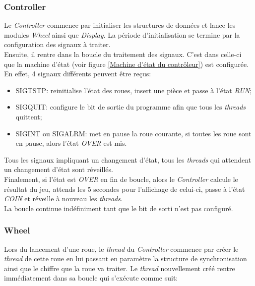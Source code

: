 \documentclass[11pt, a4paper]{article}
\begin{document}
\subsubsection{Controller}
Le \textit{Controller} commence par initialiser les structures de données
et lance les modules \textit{Wheel} ainsi que \textit{Display}.
La période d'initialisation se termine par la configuration des signaux à traiter. \\

Ensuite, il rentre dans la boucle du traitement des signaux.
C'est dans celle-ci que la machine d'état (voir figure \ref{Machine d'état du contrôleur}) est configurée.
En effet, 4 signaux différents peuvent être reçus:
\begin{itemize}
    \item SIGTSTP: reinitialise l'état des roues, insert une pièce et passe à l'état \textit{RUN};
    \item SIGQUIT: configure le bit de sortie du programme afin que tous les \textit{threads} quittent;
    \item SIGINT ou SIGALRM: met en pause la roue courante,
          si toutes les roue sont en pause, alors l'état \textit{OVER} est mis. \\
\end{itemize}

Tous les signaux impliquant un changement d'état, tous les \textit{threads}
qui attendent un changement d'état sont réveillés. \\

Finalement, si l'état est \textit{OVER} en fin de boucle, alors le \textit{Controller} calcule le résultat du jeu,
attends les 5 secondes pour l'affichage de celui-ci, passe à l'état \textit{COIN} et réveille à nouveau les \textit{threads}. \\

La boucle continue indéfiniment tant que le bit de sorti n'est pas configuré.

\subsubsection{Wheel}
Lors du lancement d'une roue, le \textit{thread} du \textit{Controller} commence par créer le \textit{thread} de cette roue
en lui passant en paramètre la structure de synchronisation ainsi que le chiffre que la roue va traiter.
Le \textit{thread} nouvellement créé rentre immédiatement dans sa boucle qui s'exécute comme suit: \\
\end{document}
